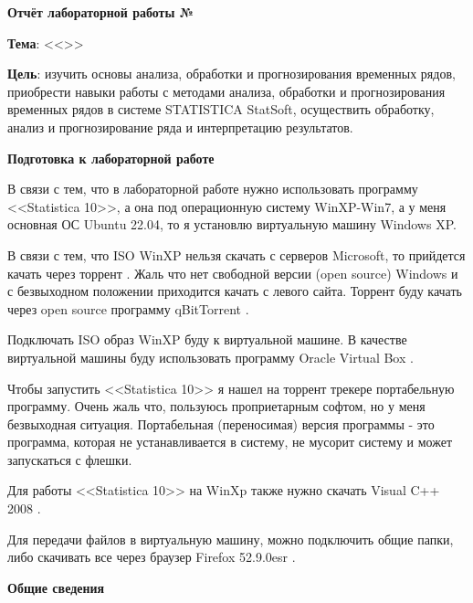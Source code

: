 \begin{center}
  \textbf{Отчёт лабораторной работы №\envReportLabNumber}
\end{center}

\textbf{Тема}:
<<\envReportTitle>>

\textbf{Цель}:
изучить основы анализа, обработки и прогнозирования временных рядов,
приобрести навыки работы с методами анализа,
обработки и прогнозирования временных рядов в системе STATISTICA StatSoft,
осуществить обработку, анализ и прогнозирование ряда и интерпретацию результатов.


{}

\begin{center}
  \textbf{Подготовка к лабораторной работе}
\end{center}

В связи с тем, что в лабораторной работе нужно использовать программу <<Statistica 10>>,
а она под операционную систему WinXP-Win7,
а у меня основная ОС Ubuntu 22.04,
то я установлю виртуальную машину Windows XP.

В связи с тем, что ISO WinXP нельзя скачать с серверов Microsoft, то прийдется качать через торрент \cite{TorrentWinXP}.
Жаль что нет свободной версии (open source) Windows и с безвыходном положении приходится качать с левого сайта.
Торрент буду качать через open source программу qBitTorrent \cite{downloadQBitTorrent}.

Подключать ISO образ WinXP буду к виртуальной машине.
В качестве виртуальной машины буду использовать программу Oracle Virtual Box \cite{downloadVirtualBox}.

Чтобы запустить <<Statistica 10>> я нашел на торрент трекере портабельную программу. 
Очень жаль что, пользуюсь проприетарным софтом, но у меня безвыходная ситуация.
Портабельная (переносимая) версия программы - это программа, которая не устанавливается в систему, не мусорит систему
и может запускаться с флешки.

Для работы <<Statistica 10>> на WinXp также нужно скачать Visual C++ 2008 \cite{downloadVisualCpp2008}.

Для передачи файлов в виртуальную машину, можно подключить общие папки,
либо скачивать все через браузер Firefox 52.9.0esr \cite{downloadFirefox5290esr}.

\begin{center}
  \textbf{Общие сведения}
\end{center}

